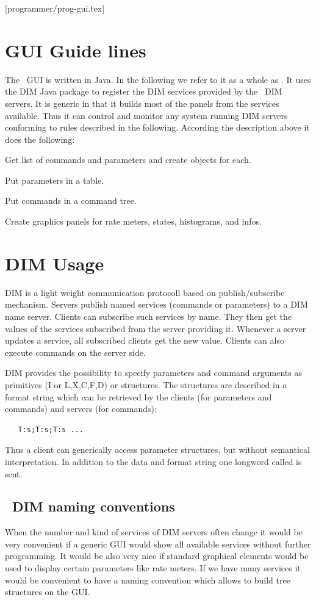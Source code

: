 [programmer/prog-gui.tex]
\section{GUI Guide lines}
The \dabc\ GUI is written in Java. In the following we refer to it
as a whole as \gui. 
It uses the DIM Java package to register the
DIM services provided by the \dabc\ DIM servers. 
It is generic in that it
builds most of the panels from the services available.
Thus it can control and monitor any system running DIM servers conforming to
rules described in the following. 
According the description above it does the following:
\begin{compactitem}[$\bullet$]
\item Get list of commands and parameters and create objects for each.
\item Put parameters in a table.
\item Put commands in a command tree.
\item Create graphics panels for rate meters, states, histograms, and infos.
\end{compactitem}

\section{DIM Usage}
DIM is a light weight communication protocoll based on publish/subscribe mechanism. Servers publish named services (commands or parameters) to a DIM name server. Clients can subscribe such services by name. They then get the values of the services subscribed from the server providing it. Whenever a server updates a service, all subscribed clients get the new value. Clients can also execute commands on the server side.

DIM provides the possibility to specify parameters and command arguments as primitives (I or L,X,C,F,D) or structures. The structures are described in a format string which can be retrieved by the clients (for parameters and commands) and servers (for commands):
\begin{verbatim}
   T:s;T:s;T:s ...
\end{verbatim}
Thus a client can generically access parameter structures, but without semantical interpretation.
In addition to the data and format string one longword called  is sent.

\subsection{\dabc\ DIM naming conventions}
When the number and kind of services of DIM servers often change it would be very convenient if a generic GUI would show all available services without further programming. It would be also very nice if standard graphical elements would be used to display certain parameters like rate meters. If we have many services it would be convenient to have a naming convention which allows to build tree structures on the GUI.

